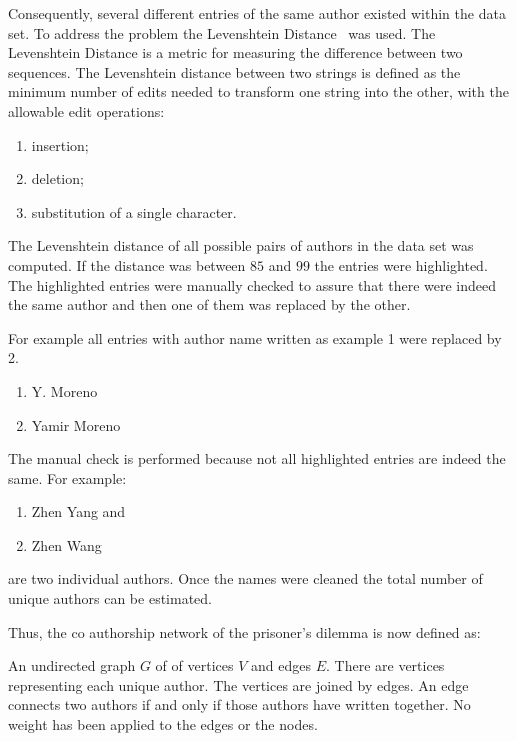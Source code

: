\documentclass{article}
\newcommand{\authors}{}
\newcommand{\edges}{}
\begin{document}
Consequently, several different entries of the same author existed within the data
set. To address the problem the Levenshtein Distance~\cite{miller2009} was used.
The Levenshtein Distance is a metric for measuring the difference between two
sequences. The Levenshtein distance between two strings is defined as the
minimum number of edits needed to transform one string into the other, with the
allowable edit operations:

\begin{enumerate}
    \item insertion;
    \item deletion;
    \item substitution of a single character.
\end{enumerate}

The Levenshtein distance of all possible pairs of authors in the data set was
computed. If the distance was between \(85\) and \(99\) the entries were
highlighted. The highlighted entries were manually checked to assure that there
were indeed the same author and then one of them was replaced by the other.

For example all entries with author name written as example 1 were replaced by
2.

\begin{enumerate}
    \item Y. Moreno
    \item Yamir Moreno
\end{enumerate}

The manual check is performed because not all highlighted entries are indeed the
same. For example:

\begin{enumerate}
    \item Zhen Yang and
    \item Zhen Wang
\end{enumerate}

are two individual authors. Once the names were cleaned the total number of
unique authors can be estimated.

Thus, the co authorship network of the prisoner's dilemma is now defined as:

An undirected graph \(G\) of of vertices \(V\) and edges \(E\). There are
\authors vertices representing each unique author. The vertices are joined by \edges
edges. An edge connects two authors if and only if those authors have written together.
No weight has been applied to the edges or the nodes.
\end{document}

